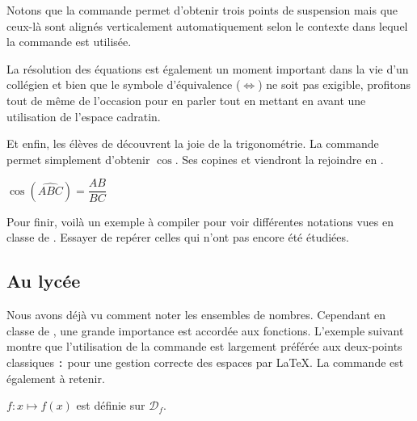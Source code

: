 \documentclass[10pt,french,openright,twoside]{book}
\begin{document}
{

\begin{info}
    Notons que la commande  permet d'obtenir trois points de suspension mais que ceux-là sont alignés verticalement automatiquement selon le contexte dans lequel la commande est utilisée.
\end{info}

La résolution des équations est également un moment important dans la vie d'un collégien et bien que le symbole d'équivalence ($\Leftrightarrow$) ne soit pas exigible, profitons tout de même de l'occasion pour en parler tout en mettant en avant une utilisation de l'espace cadratin.


Et enfin, les élèves de  découvrent la joie de la trigonométrie. La commande  permet simplement d'obtenir $\cos$. Ses copines  et  viendront la rejoindre en .\bigskip

{\NewFont
\begin{SideBySideExample}
    $\cos\left(\widehat{ABC}\right) = \dfrac{AB}{BC}$
\end{SideBySideExample}
}\bigskip

Pour finir, voilà un exemple à compiler pour voir différentes notations vues en classe de . Essayer de repérer celles qui n'ont pas encore été étudiées.


\subsection{Au lycée}

Nous avons déjà vu comment noter les ensembles de nombres. Cependant en classe de , une grande importance est accordée aux fonctions. L'exemple suivant montre que l'utilisation de la commande  est largement préférée aux deux-points classiques \verb!:! pour une gestion correcte des espaces par \LaTeX. La commande  est également à retenir.\bigskip

{\NewFont
\begin{SideBySideExample}
    $f\colon x \mapsto f(x)$ est d\'efinie sur
                                          $\mathcal D_f$.


\end{SideBySideExample}}}
\end{document}
